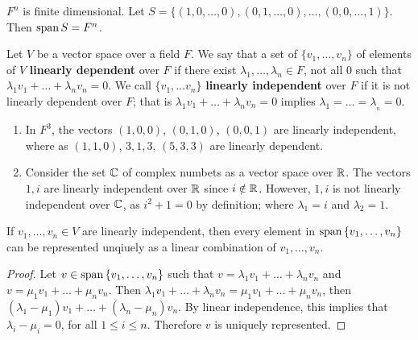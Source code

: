 \begin{example}
    $F^n$ is finite dimensional. Let
    $S=\{(1,0,\dots,0),(0,1,\dots,0),\dots,(0,0,\dots,1)\}$. Then
    $\operatorname{span}{S}=F^n$.
\end{example} 

\begin{definition}
    Let $V$ be a vector space over a field $F$. We say that a set of $\{v_1, \dots, v_n\}$ of
    elements of $V$  \textbf{linearly dependent} over $F$ if there exist
    $\lambda_1,\dots, \lambda_n \in F$, not all $0$ such that
    $\lambda_1v_1+\dots+\lambda_nv_n=0$. We call $\{v_1, \dots v_n\}$
    \textbf{linearly independent} over $F$ if it is not linearly dependent over
    $F$; that is  $\lambda_1v_1+\dots+\lambda_nv_n=0$ implies $\lambda_1= \dots
    =\lambda__n=0$.
\end{definition}

\begin{example}
    \begin{enumerate}[label=(\arabic*)]
        \item In $F^3$, the vectors  $(1,0,0)$, $(0,1,0)$, $(0,0,1)$ are linearly
        independent, where as $(1,1,0)$, $3,1,3$,  $(5,3,3)$ are linearly dependent.

    \item Consider the set $\mathbb{C}$ of  complex numbets as a vector space over
        $\mathbb{R}$. The vectors  $1,i$ are linearly independent over  $\mathbb{R}$ since  $i
        \notin \mathbb{R}$. However,  $1,i$ is not linearly independent over  $\mathbb{C}$, as
        $i^2+1=0$ by definition; where  $\lambda_1=i$ and $\lambda_2=1$.
    \end{enumerate}
\end{example}

\begin{lemma}\label{1.2.3}
    If $v_1, \dots, v_n \in V$ are linearly independent, then every element in
    $\operatorname{span}{\{v_1, \dots, v_n\}}$ can be represented unqiuely as a linear
    combination of $ v_1, \dots, v_n$.
\end{lemma}
\begin{proof}
    Let $v \in \operatorname{span}{\{v_1, \dots, v_n\}}$ such that
    $v=\lambda_1v_1+\dots+\lambda_nv_n$ and $v=\mu_1v_1+\dots+\mu_nv_n$. Then
    $\lambda_1v_1+\dots+\lambda_nv_n=\mu_1v_1+\dots+\mu_nv_n$, then
    $(\lambda_1-\mu_1)v_1+\dots+(\lambda_n-\mu_n)v_n$. By linear independence,
    this implies that $\lambda_i-\mu_i=0$, for all  $1 \leq i \leq n$. Therefore
     $v$ is uniquely represented.
\end{proof}

